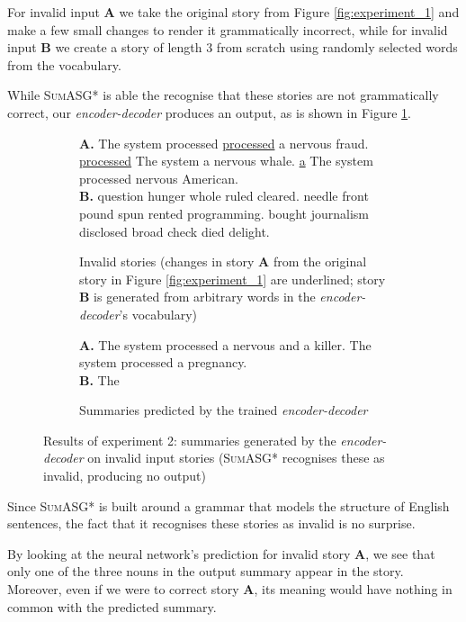 For invalid input \textbf{A} we take the original story from Figure \ref{fig:experiment_1} and make a few small changes to render it grammatically incorrect, while for invalid input \textbf{B} we create a story of length 3 from scratch using randomly selected words from the vocabulary.

While \textsc{SumASG*} is able the recognise that these stories are not grammatically correct, our \textit{encoder-decoder} produces an output, as is shown in Figure \ref{fig:experiment_2}.

\begin{figure}[H]
\begin{subfigure}{\textwidth}
\begin{displayquote}
\textbf{A.} The system processed \underline{processed} a nervous fraud. \underline{processed} The system a nervous whale. \underline{a} The system processed nervous American. \\
\textbf{B.} question hunger whole ruled cleared. needle front pound spun rented programming. bought journalism disclosed broad check died delight.
\end{displayquote}
\caption{Invalid stories (changes in story \textbf{A} from the original story in Figure \ref{fig:experiment_1} are underlined; story \textbf{B} is generated from arbitrary words in the \textit{encoder-decoder}'s vocabulary)}
\vspace{\baselineskip}
\end{subfigure}
\begin{subfigure}{\textwidth}
\begin{displayquote}
\textbf{A.} The system processed a nervous and a killer. The system processed a pregnancy. \\
\textbf{B.} The
\end{displayquote}
\caption{Summaries predicted by the trained \textit{encoder-decoder}}
\end{subfigure}
\caption{Results of experiment 2: summaries generated by the \textit{encoder-decoder} on invalid input stories (\textsc{SumASG*} recognises these as invalid, producing no output)}
\label{fig:experiment_2}
\end{figure}

\noindent
Since \textsc{SumASG*} is built around a grammar that models the structure of English sentences, the fact that it recognises these stories as invalid is no surprise.

By looking at the neural network's prediction for invalid story \textbf{A}, we see that only one of the three nouns in the output summary appear in the story. Moreover, even if we were to correct story \textbf{A}, its meaning would have nothing in common with the predicted summary.

